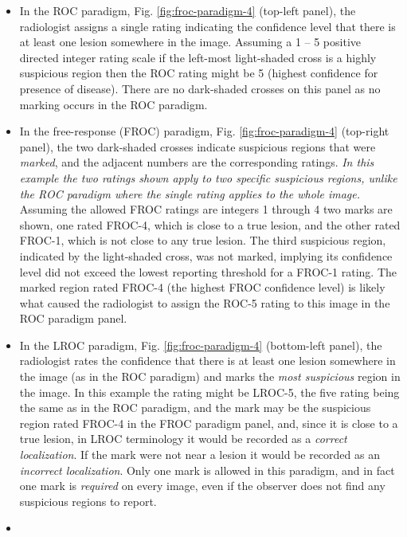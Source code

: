 \documentclass[
]{book}
\begin{document}
\begin{itemize}
\item
  In the ROC paradigm, Fig. \ref{fig:froc-paradigm-4} (top-left panel), the radiologist assigns a single rating indicating the confidence level that there is at least one lesion somewhere in the image. Assuming a 1 -- 5 positive directed integer rating scale if the left-most light-shaded cross is a highly suspicious region then the ROC rating might be 5 (highest confidence for presence of disease). There are no dark-shaded crosses on this panel as no marking occurs in the ROC paradigm.
\item
  In the free-response (FROC) paradigm, Fig. \ref{fig:froc-paradigm-4} (top-right panel), the two dark-shaded crosses indicate suspicious regions that were \emph{marked}, and the adjacent numbers are the corresponding ratings. \emph{In this example the two ratings shown apply to two specific suspicious regions, unlike the ROC paradigm where the single rating applies to the whole image.} Assuming the allowed FROC ratings are integers 1 through 4 two marks are shown, one rated FROC-4, which is close to a true lesion, and the other rated FROC-1, which is not close to any true lesion. The third suspicious region, indicated by the light-shaded cross, was not marked, implying its confidence level did not exceed the lowest reporting threshold for a FROC-1 rating. The marked region rated FROC-4 (the highest FROC confidence level) is likely what caused the radiologist to assign the ROC-5 rating to this image in the ROC paradigm panel.
\item
  In the LROC paradigm, Fig. \ref{fig:froc-paradigm-4} (bottom-left panel), the radiologist rates the confidence that there is at least one lesion somewhere in the image (as in the ROC paradigm) and marks the \emph{most suspicious} region in the image. In this example the rating might be LROC-5, the five rating being the same as in the ROC paradigm, and the mark may be the suspicious region rated FROC-4 in the FROC paradigm panel, and, since it is close to a true lesion, in LROC terminology it would be recorded as a \emph{correct localization}. If the mark were not near a lesion it would be recorded as an \emph{incorrect localization}. Only one mark is allowed in this paradigm, and in fact one mark is \emph{required} on every image, even if the observer does not find any suspicious regions to report.
\item

\end{itemize}
\end{document}
